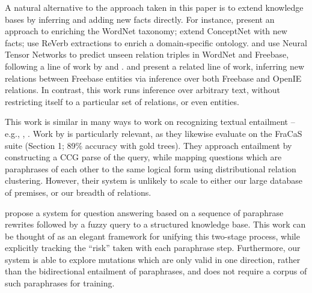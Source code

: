 A natural alternative to the approach taken in this paper is to
  extend knowledge bases by inferring and adding new facts directly.
For instance,
   present an approach to enriching 
    the WordNet taxonomy;
   extend ConceptNet with new facts;
   use ReVerb extractions to 
    enrich a domain-specific ontology.
 and 
  use Neural Tensor Networks to predict unseen relation triples in
  WordNet and Freebase, following a line of work by
   and
  .
 and 
  present a related line of work, inferring new relations between
  Freebase entities via inference over both Freebase and
  OpenIE relations.
In contrast, this work runs inference over arbitrary text, without 
  restricting itself to a particular set of relations, or even entities.

This work is similar in many ways to work on 
  recognizing textual entailment -- e.g., 
  , .
Work by  is particularly relevant,
  as they likewise evaluate on the FraCaS suite (Section 1;
  89\% accuracy with gold trees).
They approach entailment by constructing a CCG parse of the query,
  while mapping questions which are paraphrases of each other to the
  same logical form using distributional relation clustering.
However, their system is unlikely to scale to either our large
  database of premises, or our breadth of relations.

 propose a system for question answering
  based on a sequence of paraphrase rewrites followed by a fuzzy query to
  a structured knowledge base.
This work can be thought of as an elegant framework for unifying this
  two-stage process, while explicitly tracking the ``risk'' taken with
  each paraphrase step.
Furthermore, our system is able to explore mutations which are only
  valid in one direction, rather than the bidirectional entailment of
  paraphrases, and does not require a corpus of such paraphrases for
  training.



